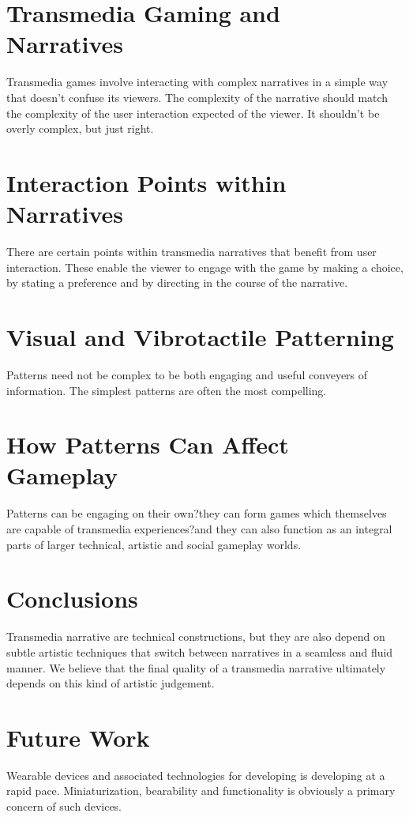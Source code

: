 \documentclass{chi-ext}
\begin{document}
\section{Transmedia Gaming and Narratives}
Transmedia games involve interacting with complex narratives in a simple way that doesn't confuse its viewers. The complexity of the narrative should match the complexity of the user interaction expected of the viewer. It shouldn't be overly complex, but just right.

\section{Interaction Points within Narratives}
There are certain points within transmedia narratives that benefit from user interaction. These enable the viewer to engage with the game by making a choice, by stating a preference and by directing in the course of the narrative. 


\section{Visual and Vibrotactile Patterning}
Patterns need not be complex to be both engaging and useful conveyers of information. The simplest patterns are often the most compelling. 

\section{How Patterns Can Affect Gameplay}
Patterns can be engaging on their own?they can form games which themselves are capable of transmedia experiences?and they can also function as an integral parts of larger technical, artistic and social gameplay worlds. 

\section{Conclusions}
Transmedia narrative are technical constructions, but they are also depend on subtle artistic  techniques that switch between narratives in a seamless and fluid manner. We believe that the final quality of a transmedia narrative ultimately depends on this kind of artistic judgement.

\section{Future Work}
Wearable devices and associated technologies for developing is developing at a rapid pace.
Miniaturization, bearability and functionality is obviously a primary concern of such devices. 
\end{document}
